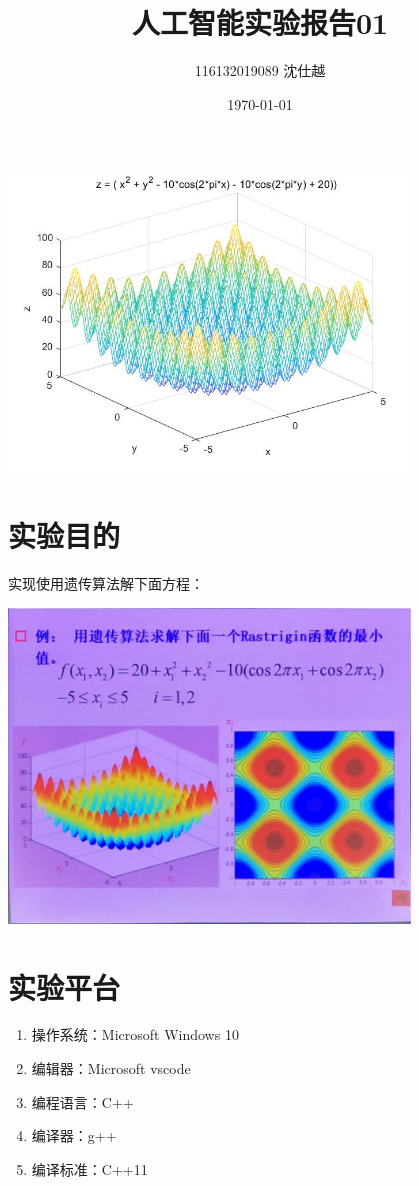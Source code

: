 \documentclass[UTF8]{ctexart}
\title{人工智能实验报告01\normalsize使用遗传算法解方程}
\author{116132019089 沈仕越}
\date{\today}
\begin{document}
\maketitle

\includegraphics[width = 0.8\textwidth]{func.jpg}
\newpage

\tableofcontents
\newpage

\section{实验目的}
实现使用遗传算法解下面方程：

\includegraphics[width = 0.8\textwidth]{problem.jpg}

\section{实验平台}

\begin{enumerate}
    \item 操作系统：Microsoft Windows 10
    \item 编辑器：Microsoft vscode
    \item 编程语言：C++
    \item 编译器：g++
    \item 编译标准：C++11
\end{enumerate}
\end{document}
